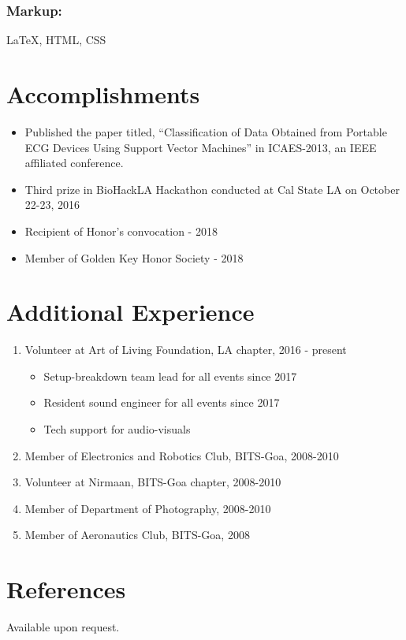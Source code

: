 \documentclass{article}
\begin{document}
\subsubsection{Markup:} 
{\LaTeX}, HTML, CSS


\section{Accomplishments}
\begin{itemize}
    \item Published the paper titled, “Classification of Data Obtained from Portable ECG Devices Using Support Vector Machines” in ICAES-2013, an IEEE affiliated conference.
    \item Third prize in BioHackLA Hackathon conducted at Cal State LA on October 22-23, 2016
    \item Recipient of Honor's convocation - 2018
    \item Member of Golden Key Honor Society - 2018
\end{itemize}

\section{Additional Experience}
\begin{enumerate}
    \item Volunteer at Art of Living Foundation, LA chapter, 2016 - present
    \begin{itemize}
        \item Setup-breakdown team lead for all events since 2017
        \item Resident sound engineer for all events since 2017
        \item Tech support for audio-visuals
    \end{itemize}
    \item Member of Electronics and Robotics Club, BITS-Goa, 2008-2010
    \item Volunteer at Nirmaan, BITS-Goa chapter, 2008-2010
    \item Member of Department of Photography, 2008-2010
    \item Member of Aeronautics Club, BITS-Goa, 2008
\end{enumerate}


\section{References}
Available upon request.
\end{document}
